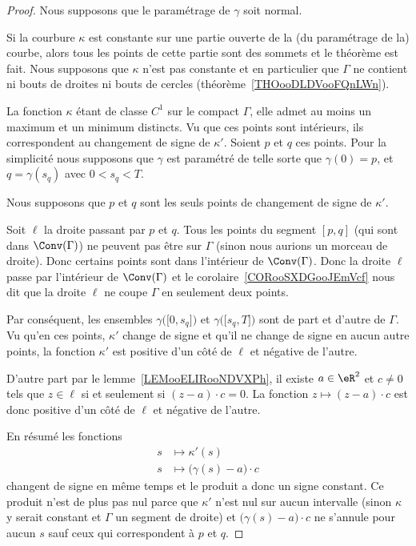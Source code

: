 \begin{proof}
	Nous supposons que le paramétrage de \( \gamma\) soit normal.

	Si la courbure \( \kappa\) est constante sur une partie ouverte de la (du paramétrage de la) courbe, alors tous les points de cette partie sont des sommets et le théorème est fait. Nous supposons que \( \kappa\) n'est pas constante et en particulier que \( \Gamma\) ne contient ni bouts de droites ni bouts de cercles (théorème~\ref{THOooDLDVooFQnLWn}).

	La fonction \( \kappa\) étant de classe \( C^1\) sur le compact \( \Gamma\), elle admet au moins un maximum et un minimum distincts. Vu que ces points sont intérieurs, ils correspondent au changement de signe de \( \kappa'\). Soient \( p\) et \( q\) ces points. Pour la simplicité nous supposons que \( \gamma\) est paramétré de telle sorte que \( \gamma(0)=p\), et \( q=\gamma(s_q)\) avec \( 0<s_q<T\).

	Nous supposons que \( p\) et \( q\) sont les seuls points de changement de signe de \( \kappa'\).

	Soit \( \ell\) la droite passant par \( p\) et \( q\). Tous les points du segment \( [p,q]\) (qui sont dans \( \Conv(\Gamma)\)) ne peuvent pas être sur \( \Gamma\) (sinon nous aurions un morceau de droite). Donc certains points sont dans l'intérieur de \( \Conv(\Gamma)\). Donc la droite \( \ell\) passe par l'intérieur de \( \Conv(\Gamma)\) et le corolaire~\ref{CORooSXDGooJEmVcf} nous dit que la droite \( \ell\) ne coupe \( \Gamma\) en seulement deux points.

	Par conséquent, les ensembles \( \gamma\big( \mathopen[ 0 , s_q \mathclose] \big)\) et \( \gamma\big( \mathopen[ s_q , T \mathclose] \big)\) sont de part et d'autre de \( \Gamma\). Vu qu'en ces points, \( \kappa'\) change de signe et qu'il ne change de signe en aucun autre points, la fonction \( \kappa'\) est positive d'un côté de \( \ell\) et négative de l'autre.

	D'autre part par le lemme~\ref{LEMooELIRooNDVXPh}, il existe \( a\in \eR^2\) et \( c\neq 0\) tels que \( z\in\ell\) si et seulement si \( (z-a)\cdot c=0\). La fonction \( z\mapsto (z-a)\cdot c\) est donc positive d'un côté de \( \ell\) et négative de l'autre.

	En résumé les fonctions
	\begin{subequations}
		\begin{align}
			s & \mapsto \kappa'(s)                     \\
			s & \mapsto \big( \gamma(s)-a \big)\cdot c
		\end{align}
	\end{subequations}
	changent de signe en même temps et le produit a donc un signe constant. Ce produit n'est de plus pas nul parce que \( \kappa'\) n'est nul sur aucun intervalle (sinon \( \kappa\) y serait constant et \( \Gamma\) un segment de droite) et \( \big( \gamma(s)-a \big)\cdot c\) ne s'annule pour aucun \( s\) sauf ceux qui correspondent à \( p\) et \( q\).


\end{proof}
